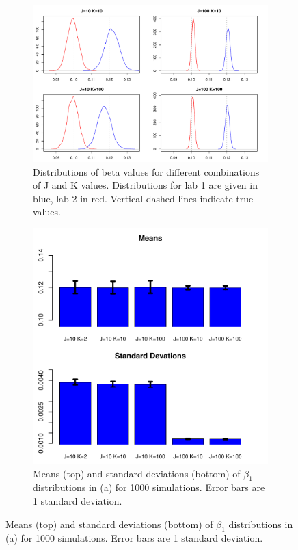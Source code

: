 \documentclass{article}
\begin{document}
\begin{figure}[h]
	\centering
	\begin{subfigure}[t]{0.55\linewidth}
		\centering
		\includegraphics[width = \linewidth, trim={0 0 0 0}, clip=true]{figs/screen_distributions.pdf}
		\caption{Distributions of beta values for different combinations of J and K values. Distributions for lab 1 are given in blue, lab 2 in red. Vertical dashed lines indicate true values.}
		\label{fig:distributions}
	\end{subfigure}	
	\hfill
	\begin{subfigure}[t]{0.366\linewidth}
		\centering
		\includegraphics[width = \linewidth, trim={0 0 0 0}, clip=true]{figs/repeat_screen.pdf}
		\caption{Means (top) and standard deviations (bottom) of $\beta_1$ distributions in (a) for 1000 simulations. Error bars are 1 standard deviation.}
		\label{fig:distributions_screen}
	\end{subfigure}	
\end{figure}
\end{document}
